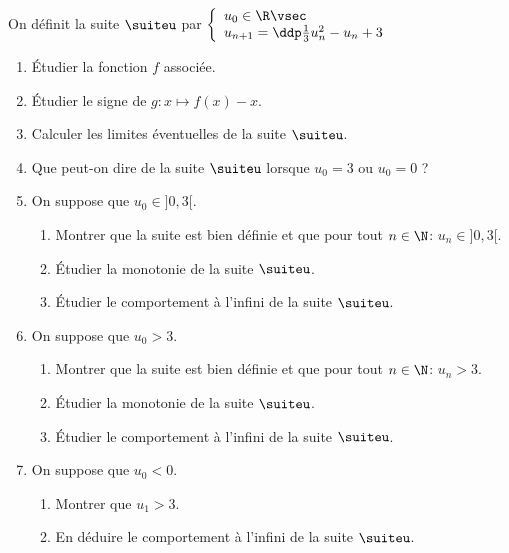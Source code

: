 \documentclass[a4paper, 11pt]{article}
\begin{document}
\begin{exercice} \;
On d\'efinit la suite $\suiteu$ par 
$\left\lbrace\begin{array}{l}
u_0\in\R\vsec\\
u_{n+1}=\ddp\frac{1}{3}u_n^2-u_n+3
\end{array}\right.$
\begin{enumerate}
\item \'Etudier la fonction $f$ associ\'ee.
\item \'Etudier le signe de $g: x\mapsto f(x)-x$.
\item Calculer les limites \'eventuelles de la suite $\suiteu$.
\item Que peut-on dire de la suite $\suiteu$ lorsque $u_0=3$ ou $u_0=0$ ?
\item On suppose que $u_0\in\rbrack 0,3\lbrack$.
\begin{enumerate}
\item Montrer que la suite est bien d\'efinie et que pour tout $n\in\N$: $u_n\in\rbrack 0,3\lbrack$.
\item \'Etudier la monotonie de la suite $\suiteu$.
\item \'Etudier le comportement \`{a} l'infini de la suite $\suiteu$.
\end{enumerate}
\item On suppose que $u_0>3$.
\begin{enumerate}
\item Montrer que la suite est bien d\'efinie et que pour tout $n\in\N$: $u_n>3$.
\item \'Etudier la monotonie de la suite $\suiteu$.
\item \'Etudier le comportement \`{a} l'infini de la suite $\suiteu$.
\end{enumerate} 
\item On suppose que $u_0<0$.
\begin{enumerate}
\item Montrer que $u_1>3$.
\item En d\'eduire le comportement \`{a} l'infini de la suite $\suiteu$.
\end{enumerate} 
\end{enumerate}
\end{exercice}
\end{document}
